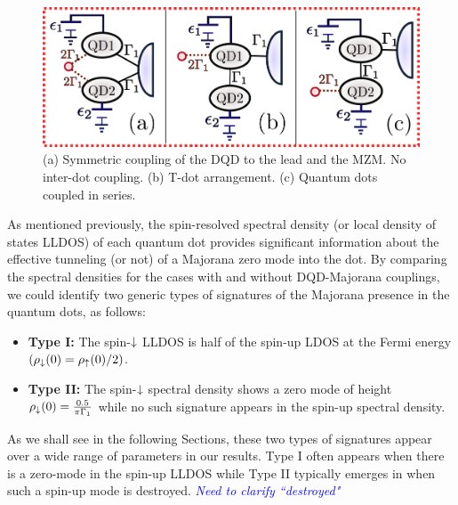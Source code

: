 \documentclass[showpacs,aps,prb,reprint,superscriptaddress]{revtex4-1}
\newcommand{\LUIS}[1]{\textcolor{blue}{\fbox{Luis} {\sl#1}}}
\begin{document}
\begin{figure}[t]
    \begin{center}
    \includegraphics[scale=0.5]{Graficos/MajoranaModels.png}
    \caption{\label{fig:MajoranaModels} (a) Symmetric coupling of the DQD to the lead and the MZM. No inter-dot coupling. (b) T-dot arrangement. (c) Quantum dots coupled in series. 
    }
\end{center}
\end{figure}

As mentioned previously, the spin-resolved spectral density (or local density of states LLDOS) of each quantum dot provides significant information about the effective tunneling (or not) of a Majorana zero mode into the dot. By comparing the spectral densities for the cases with and without DQD-Majorana couplings, we could identify two generic types of signatures of the Majorana presence in the quantum dots, as follows:

 \begin{itemize}
         \item \textbf{Type I: }  The spin-$\downarrow$ LLDOS is half of the spin-up LDOS  at the Fermi energy $(\rho_\downarrow(0)=\rho_\uparrow(0)/2)$. 
         \item \textbf{Type II: } The spin-$\downarrow$ spectral density shows a zero mode of height $ \rho_\downarrow(0) = \frac{0.5}{\pi  \Gamma_1}$ while no such signature appears in the spin-up spectral density. 
     \end{itemize}
     
As we shall see in the following Sections, these two types of signatures appear over a wide range of parameters in our results. Type I often appears when there is a zero-mode in the spin-up LLDOS while Type II typically emerges in when such a spin-up mode is destroyed. \LUIS{Need to clarify ``destroyed"}
\end{document}
